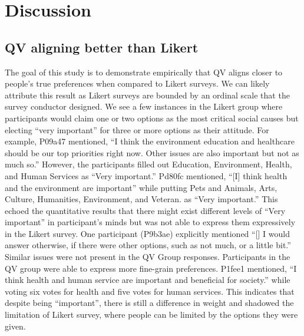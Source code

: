 \section{Discussion} \label{discussion}

\subsection{QV aligning better than Likert}
The goal of this study is to demonstrate empirically that
QV aligns closer to people's true preferences when compared to Likert surveys.
We can likely attribute this result as Likert surveys are bounded by an ordinal scale that the survey conductor designed. 
We see a few instances in the Likert group where participants would claim one or two options as the most critical social causes but electing ``very important'' for three or more options as their attitude.
For example, P09a47 mentioned, ``I think the environment education and healthcare should be our top priorities right now. Other issues are also important but not as much so.''
However, the participants filled out Education, Environment, Health, and Human Services as ``Very important.'' 
Pd80fc mentioned, ``[I] think health and the environment are important'' while putting Pets and Animals, Arts, Culture, Humanities, Environment, and Veteran. as ``Very important.'' 
This echoed the quantitative results that there might exist different levels of ``Very important'' in participant's minds but was not able to express them expressively in the Likert survey.
One participant (P9b3ae) explicitly mentioned ``[\textellipsis] I would answer otherwise, if there were other options, such as not much, or a little bit.''
Similar issues were not present in the QV Group responses.
Participants in the QV group were able to express more fine-grain preferences.
P1fee1 mentioned, ``I think health and human service are important and beneficial for society.'' while voting six votes for health and five votes for human services. This indicates that despite being ``important'', there is still a difference in weight and shadowed the limitation of Likert survey, where people can be limited by the options they were given.\par

